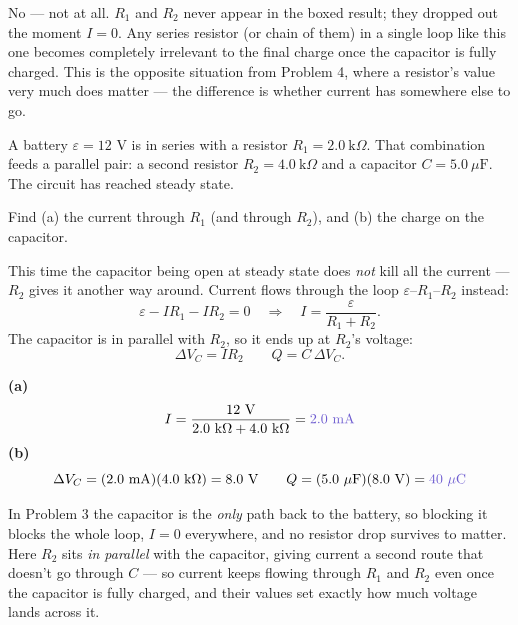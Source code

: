 \documentclass[12pt]{article}
\newcommand{\ANS}[1]{\textcolor{accent}{#1}}
\newcommand{\battv}[1]{%
  \draw[line width=0.7pt] ($(#1)+(0,0.55)$) -- ($(#1)+(0,0.12)$);
  \draw[line width=0.7pt] ($(#1)+(0,-0.12)$) -- ($(#1)+(0,-0.55)$);
  \draw[line width=1.1pt] ($(#1)+(-0.35,0.12)$) -- ($(#1)+(0.35,0.12)$);
  \draw[line width=2.4pt] ($(#1)+(-0.2,-0.12)$) -- ($(#1)+(0.2,-0.12)$);
  \node[scale=0.75] at ($(#1)+(0.6,0.12)$) {$+$};
  \node[scale=0.75] at ($(#1)+(0.6,-0.12)$) {$-$};
}
\newcommand{\reszig}[1]{%
  \fill[white] ($(#1)+(-0.65,-0.32)$) rectangle ($(#1)+(0.65,0.32)$);
  \draw ($(#1)+(-0.6,0)$)
    -- ($(#1)+(-0.42,0.22)$) -- ($(#1)+(-0.24,-0.22)$)
    -- ($(#1)+(-0.06,0.22)$) -- ($(#1)+(0.12,-0.22)$)
    -- ($(#1)+(0.3,0.22)$) -- ($(#1)+(0.48,-0.22)$)
    -- ($(#1)+(0.6,0)$);
}
\newcommand{\capsym}[1]{%
  \fill[white] ($(#1)+(-0.35,-0.4)$) rectangle ($(#1)+(0.35,0.4)$);
  \draw[line width=0.7pt] ($(#1)+(-0.35,0)$) -- ($(#1)+(-0.1,0)$);
  \draw[line width=0.7pt] ($(#1)+(0.1,0)$) -- ($(#1)+(0.35,0)$);
  \draw[line width=1.8pt] ($(#1)+(-0.1,-0.3)$) -- ($(#1)+(-0.1,0.3)$);
  \draw[line width=1.8pt] ($(#1)+(0.1,-0.3)$) -- ($(#1)+(0.1,0.3)$);
}
\begin{document}
{\small\color{accent} No --- not at all. $R_1$ and $R_2$ never appear in
the boxed result; they dropped out the moment $I=0$. Any series resistor
(or chain of them) in a single loop like this one becomes completely
irrelevant to the final charge once the capacitor is fully charged. This
is the opposite situation from Problem 4, where a resistor's value very
much does matter --- the difference is whether current has somewhere else
to go.}


A battery $\varepsilon=12$ V is in series with a resistor
$R_1=2.0\ \text{k}\Omega$. That combination feeds a parallel pair: a
second resistor $R_2=4.0\ \text{k}\Omega$ and a capacitor
$C=5.0\ \mu\text{F}$. The circuit has reached steady state.

\begin{center}
\end{center}

Find (a) the current through $R_1$ (and through $R_2$), and (b) the charge
on the capacitor.

{\small
This time the capacitor being open at steady state does \emph{not} kill
all the current --- $R_2$ gives it another way around. Current flows
through the loop $\varepsilon$--$R_1$--$R_2$ instead:
\[
\varepsilon - IR_1 - IR_2 = 0 \quad\Longrightarrow\quad I=\dfrac{\varepsilon}{R_1+R_2}.
\]
The capacitor is in parallel with $R_2$, so it ends up at $R_2$'s voltage:
\[
\Delta V_C = IR_2 \qquad Q=C\,\Delta V_C.
\]}

\textbf{(a)}
\[
I = \dfrac{12\text{ V}}{2.0\ \text{k}\Omega+4.0\ \text{k}\Omega} = \ANS{2.0\text{ mA}}
\]
\textbf{(b)}
\[
\Delta V_C = (2.0\text{ mA})(4.0\ \text{k}\Omega) = 8.0\text{ V} \qquad
Q = (5.0\ \mu\text{F})(8.0\text{ V}) = \ANS{40\ \mu\text{C}}
\]


{\small\color{accent} In Problem 3 the capacitor is the \emph{only} path
back to the battery, so blocking it blocks the whole loop, $I=0$
everywhere, and no resistor drop survives to matter. Here $R_2$ sits
\emph{in parallel} with the capacitor, giving current a second route that
doesn't go through $C$ --- so current keeps flowing through $R_1$ and
$R_2$ even once the capacitor is fully charged, and their values set
exactly how much voltage lands across it.}
\end{document}
